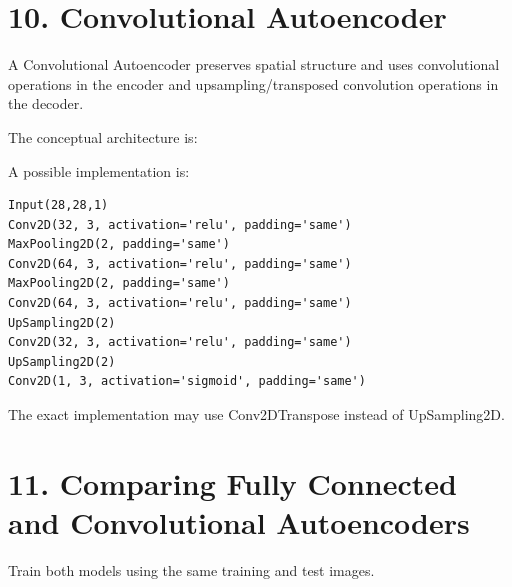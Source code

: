 \documentclass[10pt]{article}
\begin{document}
\section*{10. Convolutional Autoencoder}

A Convolutional Autoencoder preserves spatial structure and uses convolutional
operations in the encoder and upsampling/transposed convolution operations
in the decoder.

The conceptual architecture is:

\begin{center}
\end{center}

A possible implementation is:

\begin{verbatim}
Input(28,28,1)
Conv2D(32, 3, activation='relu', padding='same')
MaxPooling2D(2, padding='same')
Conv2D(64, 3, activation='relu', padding='same')
MaxPooling2D(2, padding='same')
Conv2D(64, 3, activation='relu', padding='same')
UpSampling2D(2)
Conv2D(32, 3, activation='relu', padding='same')
UpSampling2D(2)
Conv2D(1, 3, activation='sigmoid', padding='same')
\end{verbatim}

The exact implementation may use Conv2DTranspose instead of UpSampling2D.

\section*{11. Comparing Fully Connected and Convolutional Autoencoders}

Train both models using the same training and test images.
\end{document}
